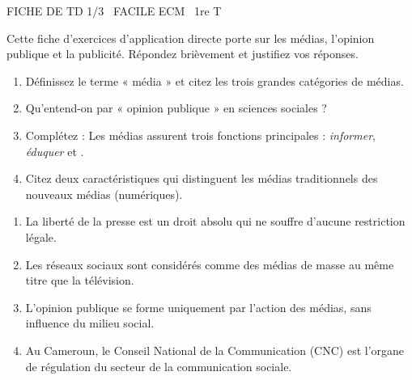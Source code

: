 \documentclass[11pt]{article}
\begin{document}
\begin{tcolorbox}[enhanced,colback=popink,colframe=popink,arc=10pt,boxrule=0pt,left=12pt,right=12pt,top=9pt,bottom=9pt]
{\color{white}\popxbold\small FICHE DE TD 1/3 \textbullet\ FACILE \hfill ECM \textbullet\ 1re T\par}
\end{tcolorbox}
\vspace{4pt}
\noindent Cette fiche d'exercices d'application directe porte sur les médias, l'opinion publique et la publicité. Répondez brièvement et justifiez vos réponses.

\begin{exercice}
\begin{enumerate}
    \item Définissez le terme « média » et citez les trois grandes catégories de médias.
    \item Qu'entend-on par « opinion publique » en sciences sociales ?
    \item Complétez : Les médias assurent trois fonctions principales : \textit{informer}, \textit{éduquer} et \underline{\hspace{4cm}}.
    \item Citez deux caractéristiques qui distinguent les médias traditionnels des nouveaux médias (numériques).
\end{enumerate}
\end{exercice}

\begin{exercice}
\begin{enumerate}
    \item La liberté de la presse est un droit absolu qui ne souffre d'aucune restriction légale.
    \item Les réseaux sociaux sont considérés comme des médias de masse au même titre que la télévision.
    \item L'opinion publique se forme uniquement par l'action des médias, sans influence du milieu social.
    \item Au Cameroun, le Conseil National de la Communication (CNC) est l'organe de régulation du secteur de la communication sociale.
\end{enumerate}
\end{exercice}
\end{document}
